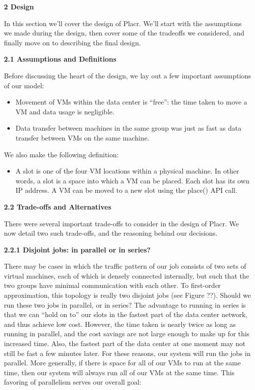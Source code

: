 \documentclass[11pt]{article}
\begin{document}
\LARGE{\textbf{2 Design}}
\normalsize

In this section we’ll cover the design of Placr.  We’ll start with the assumptions we made during the design, then cover some of the tradeoffs we considered, and finally move on to describing the final design.


\Large{\textbf{2.1 Assumptions and Definitions}}

\normalsize

Before discussing the heart of the design, we lay out a few important assumptions of our model:
\vspace{-4mm}
\begin{itemize}
  \item 
Movement of VMs within the data center is “free”: the time taken to move a VM and data usage is negligible.
  \item Data transfer between machines in the same group was just as fast as data transfer between VMs on the same machine.
\end{itemize}

We also make the following definition:
\vspace{-4mm}
\begin{itemize}
  \item 
A slot is one of the four VM locations within a physical machine.  In other words, a slot is a space into which a VM can be placed.  Each slot has its own IP address.  A VM can be moved to a new slot using the place() API call.
\end{itemize}

\Large{\textbf{2.2 Trade-offs and Alternatives}}

\normalsize

There were several important trade-offs to consider in the design of Placr.  We now detail two such trade-offs, and the reasoning behind our decisions.

\large{\textbf{2.2.1 Disjoint jobs: in parallel or in series?}}

\normalsize 
There may be cases in which the traffic pattern of our job consists of two sets of virtual machines, each of which is densely connected internally, but such that the two groups have minimal communication with each other.  To first-order approximation, this topology is really two disjoint jobs (see Figure ??).  Should we run these two jobs in parallel, or in series?  The advantage to running in series is that we can “hold on to” our slots in the fastest part of the data center network, and thus achieve low cost.  However, the time taken is nearly twice as long as running in parallel, and the cost savings are not large enough to make up for this increased time.  Also, the fastest part of the data center at one moment may not still be fast a few minutes later.  For these reasons, our system will run the jobs in parallel.  More generally, if there is space for all of our VMs to run at the same time, then our system will always run all of our VMs at the same time.  This favoring of parallelism serves our overall goal:
\end{document}
